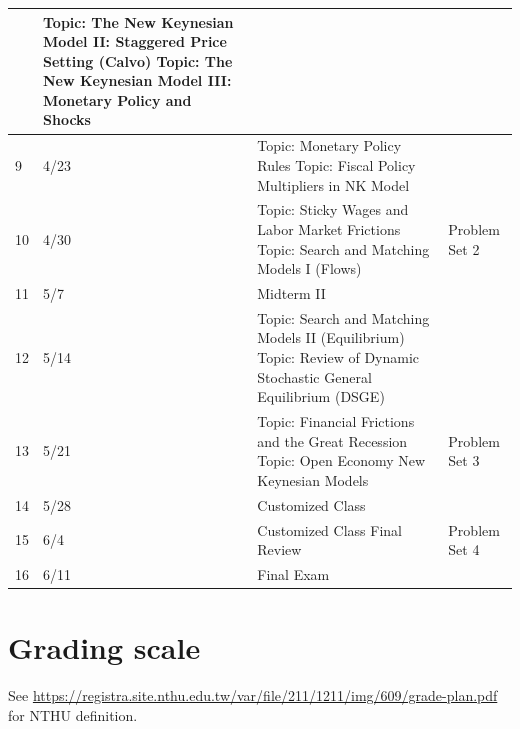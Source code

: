 \documentclass[12pt]{article}
\begin{document}
\begin{tabular}{|p{\bb}|p{\bb}|p{\pp}|p{\rr}|}
    &
        Topic: The New Keynesian Model II: Staggered Price Setting (Calvo)
        \newline
        Topic: The New Keynesian Model III: Monetary Policy and Shocks
        &
    \\
    \hline
        9
        &
        4/23
        &
        Topic: Monetary Policy Rules
    \newline
        Topic: Fiscal Policy Multipliers in NK Model
        &
    \\
    \hline
        10
        &
        4/30
        &
        Topic: Sticky Wages and Labor Market Frictions
        \newline
         Topic: Search and Matching Models I (Flows)
        &
        Problem Set 2
    \\
    \hline
        11
        &
        5/7
        &
        Midterm II
        &
    \\
    \hline
        12
        &
        5/14
        &
        Topic: Search and Matching Models II (Equilibrium)
        \newline
        Topic: Review of Dynamic Stochastic General Equilibrium (DSGE)
        &
    \\
    \hline
        13
        &
        5/21

       &
        Topic: Financial Frictions and the Great Recession
        \newline
        Topic: Open Economy New Keynesian Models
        &
        Problem Set 3
    \\
    \hline
        14
        &
        5/28
        &
        Customized Class

    &
    \\
    \hline
        15
        &
        6/4
        &
        Customized Class
        \newline
        Final Review
        &
        Problem Set 4
    \\
    \hline
        16

  &
        6/11
        &
        Final Exam
        &
    \\
    \hline
\end{tabular}

\section*{Grading scale}

See \url{https://registra.site.nthu.edu.tw/var/file/211/1211/img/609/grade-plan.pdf} for NTHU definition.
\end{document}
